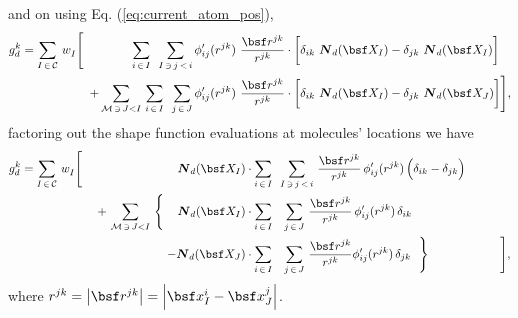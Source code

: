 \documentclass[a4paper,10pt]{article}
\newcommand{\refeq}[1]{Eq. (\ref{eq:#1})}
\def\gz  #1{           \mbox{\boldmath $\mit #1$}}
\newcommand{\norm}[1]{\left\lvert #1 \right\rvert}
\def\mcl  #1{               {\cal #1}}
\begin{document}
and on using \refeq{current_atom_pos},
\begin{align}
 g^k_d = \sum_{I \, \in \, \mcl C}  \, w^{}_I
	  \Bigg[
		\,\,\,\,\,\,\,\,\,\,\,\,\,\,\,\,\,\,\,\,\,\,\,
		\sum_{i \, \in \, I}       \,\,\,
		\sum_{I \, \ni \, j \, < \, i}       \,
		  &{\phi}^\prime_{ij} (r^{jk})\, \, 
		    \frac {\bsf r^{jk}}{r^{jk}}
		    \cdot
		    \bigg[
		      \delta_{ik} \,\, \gz N_d( \bsf X_{I})  
		      - 
		      \delta_{jk} \,\, \gz N_d( \bsf X_{I})
		    \bigg] \\
	      +
	      \sum_{\mcl M \, \ni \, J < I}  \,
	      \sum_{i \, \in \, I}       \,\,\,
	      \sum_{j \, \in \, J}       \,
		&{\phi}^\prime_{ij} (r^{jk})\, \, 
		  \frac {\bsf r^{jk}}{r^{jk}}
		  \cdot
		  \bigg[
		    \delta_{ik} \,\, \gz N_d( \bsf X_{I})  
		    - 
		    \delta_{jk} \,\, \gz N_d( \bsf X_{J})
		  \bigg]
	 \Bigg],
\end{align}
factoring out the shape function evaluations at molecules' locations we have
\begin{align}
 g^k_d = \sum_{I \, \in \, \mcl C}  \, w^{}_I
	  \Bigg[
		\,\,\,\,\,\,\,\,\,\,\,\,
		\,\,\,\,\,\,\,\,\,\,\,\,
		\,\,\,\,\,\,\,\,\,\,\,\,
		\,\,\,\,\,\,\,\,\,\,\,\,
		\gz N_d( \bsf X_{I})
		&\cdot
		  \sum_{i \, \in \, I}            \,\,\,
		  \sum_{I \, \ni \, j \, < \, i} \,
		  \frac {\bsf r^{jk}}{r^{jk}}               \,
		    {\phi}^\prime_{ij} (r^{jk})        \,
		      \Big(
			\delta_{ik} 
			- 
			\delta_{jk}
		      \Big)
		\\
	      + \,
		\sum_{\mcl M \, \ni \, J < I}  \,
		\Bigg\{
		  \,\,\,\,\,\,\,
		  \gz N_d( \bsf X_{I})
		  &\cdot
		    \sum_{i \, \in \, I}    \,\,\,\,\,
		    \sum_{j \, \in \, J}   \,
		    \frac {\bsf r^{jk}}{r^{jk}}       \,
		      {\phi}^\prime_{ij}(r^{jk}) \,
		      \delta_{ik}           \,
		    \\
		  -
		  \gz N_d( \bsf X_{J})
		  &\cdot
		    \sum_{i \, \in \, I}    \,\,\,\,\,
		    \sum_{j \, \in \, J}   \,
		    \frac{\bsf r^{jk}}{r^{jk}}
		      {\phi}^\prime_{ij}(r^{jk}) \,
		      \delta_{jk}           \,
		\,\,\,
		\Bigg\}
		\,\,\,\,\,\,\,\,\,\,\,\,
		\,\,\,\,\,\,\,\,\,\,\,\,
		\,\,\,\,\,\,\,\,\,\,\,\,
	 \Bigg],
\end{align}
where $r^{jk} = \norm{\bsf r^{jk}} = \norm{ \bsf x^{i}_{I} - \bsf x^{j}_{J} }$.
\end{document}
